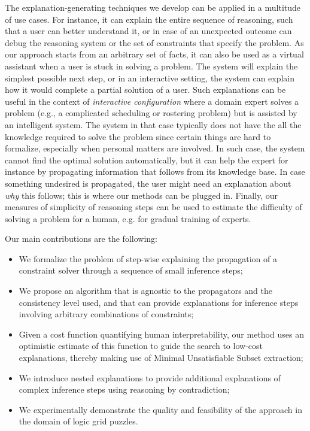 The explanation-generating techniques we develop can be applied in a multitude of use cases. 
For instance, it can explain the entire sequence of reasoning, such that a user can better understand it, or in case of an unexpected outcome can debug the reasoning system or the set of constraints that specify the problem. 
As our approach starts from an arbitrary set of facts, it can also be used as a virtual assistant when a user is stuck in solving a problem.
The system will explain the simplest possible next step, or in an interactive setting, the system can explain how it would complete a partial solution of a user. Such explanations can be useful in the context of  \emph{interactive configuration} \cite{felfernig2014knowledge} where a domain expert solves a problem (e.g., a complicated scheduling or rostering problem) but is assisted by an intelligent system. 
The system in that case typically does not have the all the knowledge required to solve the problem since certain things are hard to formalize, especially when personal matters are involved. In such case, the system cannot find the optimal solution automatically, but it can help the expert for instance by propagating information that follows from its knowledge base. In case something undesired is propagated, the user might need an explanation about \emph{why} this follows; this is where our methods can be plugged in.
% 
% 
Finally, our measures of simplicity of reasoning steps can be used to estimate the difficulty of solving a problem for a human, e.g. for gradual training of experts.


Our main contributions are the following:
\begin{itemize}
	\item We formalize the problem of step-wise explaining the propagation of a constraint solver through a sequence of small inference steps;
	\item We propose an algorithm that is agnostic to the propagators and the consistency level used, and that can provide explanations for inference steps involving arbitrary combinations of constraints;
	\item Given a cost function quantifying human interpretability, our method uses an optimistic estimate of this function to guide the search to low-cost explanations, thereby making use of Minimal Unsatisfiable Subset extraction;
	\item We introduce nested explanations to provide additional explanations of complex inference steps using reasoning by contradiction;
	\item We experimentally demonstrate the quality and feasibility of the approach in the domain of logic grid puzzles.
\end{itemize}


